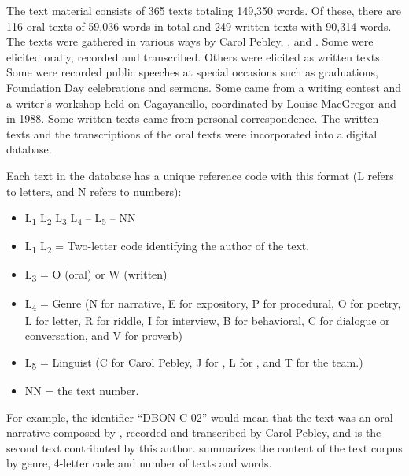 The text material consists of 365 texts totaling 149,350 words. Of these, there are 116 oral texts of 59,036 words in total and 249 written texts with 90,314 words. The texts were gathered in various ways by Carol Pebley, , and . Some were elicited orally, recorded and transcribed. Others were elicited as written texts. Some were recorded public speeches at special occasions such as graduations, Foundation Day celebrations and sermons. Some came from a writing contest and a writer’s workshop held on Cagayancillo, coordinated by Louise MacGregor and  in 1988. Some written texts came from personal correspondence. The written texts and the transcriptions of the oral texts were incorporated into a digital database.

Each text in the database has a unique reference code with this format (L refers to letters, and N refers to numbers):
\TabPositions{2cm,4cm,6cm,8cm}
\begin{itemize}
\item[] L\textsubscript{1} L\textsubscript{2} L\textsubscript{3} L\textsubscript{4} -- L\textsubscript{5} -- NN

\item[] L\textsubscript{1} L\textsubscript{2} = Two-letter code identifying the author of the text.

\item[] L\textsubscript{3} = O (oral) or W (written)

\item[] L\textsubscript{4} = Genre (N for narrative, E for expository, P for procedural, O for poetry, L for letter, R for riddle, I for interview, B for behavioral, C for dialogue or conversation, and V for proverb)

\item[] L\textsubscript{5} = Linguist (C for Carol Pebley, J for , L for , and T for the team.)

\item[] NN = the text number.
\end{itemize}

For example, the identifier “DBON-C-02” would mean that the text was an oral narrative composed by , recorded and transcribed by Carol Pebley, and is the second text contributed by this author.
 summarizes the content of the text corpus by genre, 4-letter code and number of texts and words.

